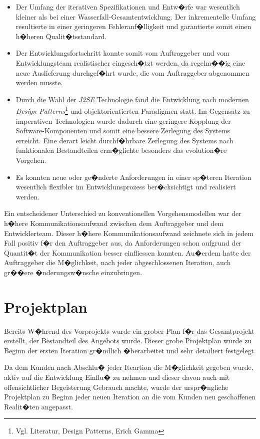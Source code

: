 \documentclass[a4paper,titlepage,12pt,ngerman]{scrbook}
\begin{document}
\begin{itemize}
\item Der Umfang der iterativen Spezifikationen und Entw�rfe war wesentlich
kleiner als bei einer Wasserfall-Gesamtentwicklung. Der inkrementelle Umfang
resultierte in einer geringeren Fehleranf�lligkeit und garantierte somit einen
h�heren Qualit�tsstandard.
\item Der Entwicklungsfortschritt konnte somit vom Auftraggeber und vom
Entwicklungsteam realistischer eingesch�tzt werden, da regelm��ig
eine neue Auslieferung durchgef�hrt wurde, die vom Auftraggeber abgenommen
werden musste.
\item Durch die Wahl der {\it J2SE} Technologie fand die Entwicklung
nach modernen {\it Design Patterns}\footnote{Vgl. Literatur, Design
Patterns, Erich Gamma} und objektorientierten Paradigmen statt. Im Gegensatz zu
imperativen Technologien wurde dadurch eine geringere Kopplung der
Software-Komponenten und somit eine bessere Zerlegung des Systems erreicht.
Eine derart leicht durchf�hrbare Zerlegung des Systems nach funktionalen
Bestandteilen erm�glichte besonders das evolution�re Vorgehen.
\item Es konnten neue oder ge�nderte Anforderungen in einer sp�teren Iteration
wesentlich flexibler im Entwicklunsprozess ber�cksichtigt und realisiert
werden.
\end{itemize}

Ein entscheidener Unterschied zu konventionellen Vorgehensmodellen war der
h�here Kommunikationsaufwand zwischen dem Auftraggeber und dem Entwicklerteam.
Dieser h�here Kommunikationsaufwand zeichnete sich in jedem Fall positiv f�r den
Auftraggeber aus, da Anforderungen schon aufgrund der Quantit�t der
Kommunikation besser einfliessen konnten. Au�erdem hatte der Auftraggeber die
M�glichkeit, nach jeder abgeschlossenen Iteration, auch gr��ere �nderungsw�nsche
einzubringen. \par


\section{Projektplan}

Bereits W�hrend des Vorprojekts wurde ein grober Plan f�r das Gesamtprojekt erstellt,
der Bestandteil des Angebots wurde. Dieser grobe Projektplan wurde zu Beginn der
ersten Iteration gr�ndlich �berarbeitet und sehr detailiert festgelegt.\par

Da dem Kunden nach Abschlu� jeder Iteartion die M�glichkeit gegeben wurde, aktiv auf
die Entwicklung Einflu� zu nehmen und dieser davon auch mit offensichtlicher
Begeisterung Gebrauch machte, wurde der urspr�ngliche Projektplan zu Beginn jeder neuen
Iteration an die vom Kunden neu geschaffenen Realit�ten angepasst.
\end{document}

